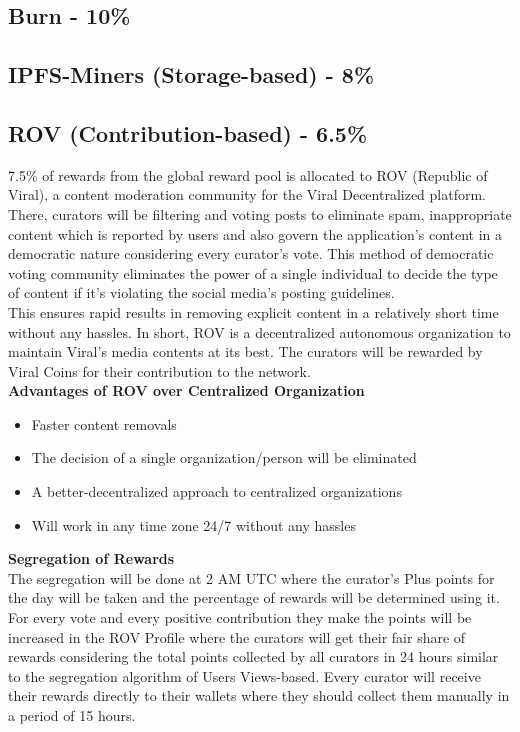 \documentclass[10pt]{article}
\begin{document}
\subsection{Burn - 10\%}

\subsection{IPFS-Miners (Storage-based) - 8\%}


\subsection{ROV (Contribution-based) - 6.5\%}

7.5\% of rewards from the global reward pool is allocated to ROV (Republic of Viral), a content moderation community for the Viral Decentralized platform. There, curators will be filtering and voting posts to eliminate spam, inappropriate content which is reported by users and also govern the application's content in a democratic nature considering every curator's vote. This method of democratic voting community eliminates the power of a single individual to decide the type of content if it's violating the social media's posting guidelines. \\

This ensures rapid results in removing explicit content in a relatively short time without any hassles. In short, ROV is a decentralized autonomous organization to maintain Viral's media contents at its best. The curators will be rewarded by Viral Coins for their contribution to the network.\\

\textbf{Advantages of ROV over Centralized Organization}
\begin{itemize}[leftmargin=+0.2in]
\item Faster content removals
\item The decision of a single organization/person will be eliminated
\item A better-decentralized approach to centralized organizations
\item Will work in any time zone 24/7 without any hassles
\end{itemize}

\textbf{Segregation of Rewards}\\

The segregation will be done at 2 AM UTC where the curator's Plus points for the day will be taken and the percentage of rewards will be determined using it. For every vote and every positive contribution they make the points will be increased in the ROV Profile where the curators will get their fair share of rewards considering the total points collected by all curators in 24 hours similar to the segregation algorithm of Users Views-based. Every curator will receive their rewards directly to their wallets where they should collect them manually in a period of 15 hours.\\
\end{document}

